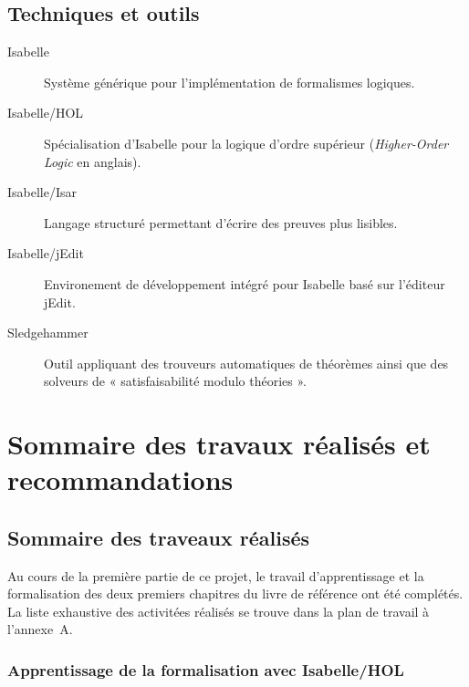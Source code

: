 \documentclass[a4paper, oneside, 12pt, titlepage]{article}
\begin{document}
\subsection{Techniques et outils}

\begin{description}
  \item[Isabelle] Système générique pour l'implémentation de formalismes logiques.
  \item[Isabelle/HOL] Spécialisation d'Isabelle pour la logique d'ordre supérieur
    (\emph{Higher-Order Logic} en anglais).
  \item[Isabelle/Isar] Langage structuré permettant d'écrire des preuves plus lisibles.
  \item[Isabelle/jEdit] Environement de développement intégré pour Isabelle basé sur l'éditeur
    jEdit.
  \item[Sledgehammer] Outil appliquant des trouveurs automatiques de théorèmes ainsi que des
    solveurs de « satisfaisabilité modulo théories ».
\end{description}

\section{Sommaire des travaux réalisés et recommandations}

\subsection{Sommaire des traveaux réalisés}



Au cours de la première partie de ce projet, le travail d'apprentissage et la formalisation des deux
premiers chapitres du livre de référence ont été complétés. La liste exhaustive des activitées
réalisés se trouve dans la plan de travail à l'annexe~A.

\subsubsection{Apprentissage de la formalisation avec Isabelle/HOL}
\end{document}
